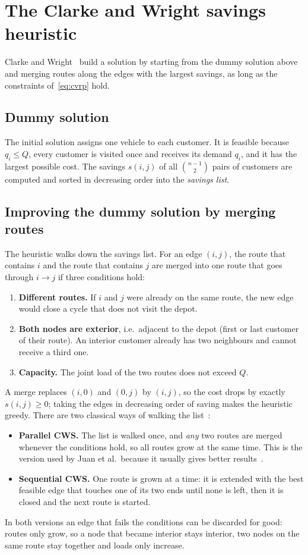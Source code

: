 \documentclass[10pt,a4paper]{article}
\begin{document}
\section{The Clarke and Wright savings heuristic}
\label{sec:cws}

Clarke and Wright~\cite{cw1964} build a solution by starting from the dummy solution above and merging
routes along the edges with the largest savings, as long as the constraints of~\eqref{eq:cvrp} hold.

\subsection{Dummy solution}

The initial solution assigns one vehicle to each customer. It is feasible because $q_i\le Q$, every
customer is visited once and receives its demand $q_i$, and it has the largest possible cost. The savings
$s(i,j)$ of all $\binom{n-1}{2}$ pairs of customers are computed and sorted in decreasing order into the
\emph{savings list}.

\subsection{Improving the dummy solution by merging routes}

The heuristic walks down the savings list. For an edge $(i,j)$, the route that contains $i$ and the route
that contains $j$ are merged into one route that goes through $i\to j$ if three conditions hold:
\begin{enumerate}
\item \textbf{Different routes.} If $i$ and $j$ were already on the same route, the new edge would close
a cycle that does not visit the depot.
\item \textbf{Both nodes are exterior}, i.e.\ adjacent to the depot (first or last customer of their
route). An interior customer already has two neighbours and cannot receive a third one.
\item \textbf{Capacity.} The joint load of the two routes does not exceed $Q$.
\end{enumerate}
A merge replaces $(i,0)$ and $(0,j)$ by $(i,j)$, so the cost drops by exactly $s(i,j)\ge0$; taking the
edges in decreasing order of saving makes the heuristic greedy. There are two
classical ways of walking the list~\cite{cw1964,juan2011}:
\begin{itemize}
\item \textbf{Parallel CWS.} The list is walked once, and \emph{any} two routes are merged whenever the
conditions hold, so all routes grow at the same time. This is the version used by Juan et al.\ because it
usually gives better results~\cite{juan2011}.
\item \textbf{Sequential CWS.} One route is grown at a time: it is extended with the best feasible edge
that touches one of its two ends until none is left, then it is closed and the next route is started.
\end{itemize}
In both versions an edge that fails the conditions can be discarded for good: routes only grow, so a
node that became interior stays interior, two nodes on the same route stay together and loads only
increase.
\end{document}
